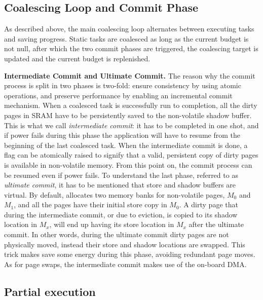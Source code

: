 \subsection{Coalescing Loop and Commit Phase}

As described above, the main coalescing loop alternates between executing tasks and saving progress. Static tasks are coalesced as long as the current budget is not null, after which the two commit phases are triggered, the coalescing target is updated and the current budget is replenished.

\textbf{Intermediate Commit and Ultimate Commit.} The reason why the commit process is split in two phases is two-fold: ensure consistency by using atomic operations, and preserve performance by enabling an incremental commit mechanism. When a coalesced task is successfully run to completion, all the dirty pages in SRAM have to be persistently saved to the non-volatile shadow buffer. This is what we call \emph{intermediate commit}: it has to be completed in one shot, and if power fails during this phase the application will have to resume from the beginning of the last coalesced task. When the intermediate commit is done, a flag can be atomically raised to signify that a valid, persistent copy of dirty pages is available in non-volatile memory. From this point on, the commit process can be resumed even if power fails.
To understand the last phase, referred to as \emph{ultimate commit}, it has to be mentioned that store and shadow buffers are virtual. By default, \sys allocates two memory banks for non-volatile pages, $M_0$ and $M_1$, and all the pages have their initial store copy in $M_0$. A dirty page that during the intermediate commit, or due to eviction, is copied to its shadow location in $M_x$, will end up having its store location in $M_x$ after the ultimate commit. In other words, during the ultimate commit dirty pages are not physically moved, instead their store and shadow locations are swapped. This trick makes \sys save some energy during this phase, avoiding redundant page moves. As for page swaps, the intermediate commit makes use of the on-board DMA.

\subsection{Partial execution}

